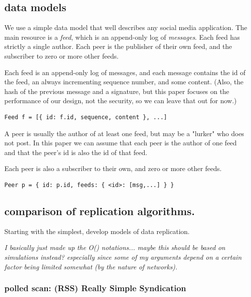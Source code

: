 \documentclass[sigconf]{acmart}
\begin{document}

\subsection{data models}

We use a simple data model that well describes any social media
application.  The main resource is a {\em feed}, which is an
append-only log of {\em messages}.  Each feed has strictly a single
author. Each peer is the publisher of their own feed, and the
subscriber to zero or more other feeds.

Each feed is an append-only log of messages, and each message contains
the id of the feed, an always incrementing sequence number, and some
content.  (Also, the hash of the previous message and a signature, but
this paper focuses on the performance of our design, not the security,
so we can leave that out for now.)

\begin{verbatim}
Feed f = [{ id: f.id, sequence, content }, ...]
\end{verbatim}

A peer is usually the author of at least one feed, but may be a
"lurker" who does not post.  In this paper we can assume that each
peer is the author of one feed and that the peer's id is also the id
of that feed.

Each peer is also a subscriber to their own, and zero or more other feeds.

\begin{verbatim}
Peer p = { id: p.id, feeds: { <id>: [msg,...] } }
\end{verbatim}

\subsection{comparison of replication algorithms.}

Starting with the simplest, develop models of data replication.

{\em I basically just made up the O() notations... maybe this should
  be based on simulations instead?  especially since some of my
  arguments depend on a certain factor being limited somewhat (by the
  nature of networks).}

\subsubsection{polled scan: (RSS) Really Simple Syndication}\ \\ \vspace{-1em}
\end{document}
